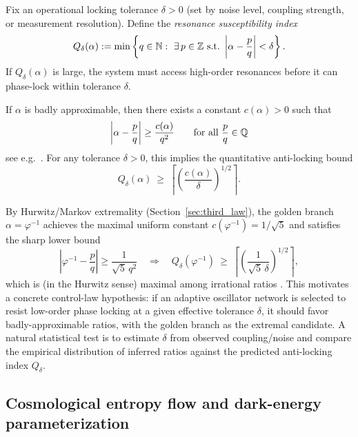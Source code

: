 Fix an operational locking tolerance $\delta>0$ (set by noise level, coupling strength, or measurement resolution). Define the \emph{resonance susceptibility index}
\begin{equation}
  Q_\delta(\alpha)
  := \min\left\{q\in\NN:\ \exists\,p\in\ZZ\ \text{s.t.}\ \left|\alpha-\frac{p}{q}\right|<\delta\right\}.
\end{equation}
If $Q_\delta(\alpha)$ is large, the system must access high-order resonances before it can phase-lock within tolerance $\delta$.

\begin{proposition}
\label{prop:Qdelta_bound}
If $\alpha$ is badly approximable, then there exists a constant $c(\alpha)>0$ such that
\begin{equation}
  \left|\alpha-\frac{p}{q}\right| \ge \frac{c(\alpha)}{q^2}
  \qquad\text{for all } \frac{p}{q}\in\mathbb{Q}
\end{equation}
see e.g.\ \cite{Cassels1957}.
For any tolerance $\delta>0$, this implies the quantitative anti-locking bound
\begin{equation}
  Q_\delta(\alpha)\ \ge\ \left\lceil \left(\frac{c(\alpha)}{\delta}\right)^{1/2}\right\rceil.
\end{equation}
\end{proposition}

By Hurwitz/Markov extremality (Section~\ref{sec:third_law}), the golden branch $\alpha=\varphi^{-1}$ achieves the maximal uniform constant $c(\varphi^{-1})=1/\sqrt{5}$ and satisfies the sharp lower bound
\begin{equation}
  \left|\varphi^{-1}-\frac{p}{q}\right|\ge \frac{1}{\sqrt{5}\,q^2}
  \quad\Rightarrow\quad
  Q_\delta(\varphi^{-1}) \ \ge\ \left\lceil\left(\frac{1}{\sqrt{5}\,\delta}\right)^{1/2}\right\rceil,
\end{equation}
which is (in the Hurwitz sense) maximal among irrational ratios \cite{Cassels1957}. This motivates a concrete control-law hypothesis: if an adaptive oscillator network is selected to resist low-order phase locking at a given effective tolerance $\delta$, it should favor badly-approximable ratios, with the golden branch as the extremal candidate. A natural statistical test is to estimate $\delta$ from observed coupling/noise and compare the empirical distribution of inferred ratios against the predicted anti-locking index $Q_\delta$.

\subsection{Cosmological entropy flow and dark-energy parameterization}

